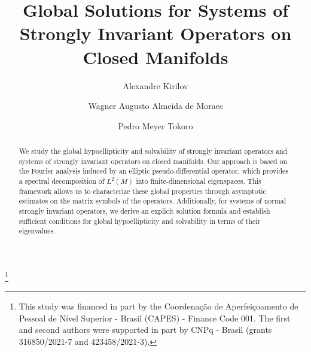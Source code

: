 \documentclass{amsart}
\theoremstyle{definition}
\theoremstyle{remark}
\numberwithin{equation}{section}
\begin{document}
	
	\title[Global Solutions for Systems on closed manifolds]{Global Solutions for Systems of Strongly Invariant Operators on Closed Manifolds}
	
	
	\author[A. Kirilov]{Alexandre Kirilov}
	\address{
		Departamento de Matem\'atica 
		Universidade Federal do Paran\'a  
		Caixa Postal 19096, CEP 81530-090, Curitiba 
		Brasil}
	\thanks{This study was financed in part by the Coordenação de Aperfeiçoamento de Pessoal de Nível Superior - Brasil (CAPES) - Finance Code 001. The first and second authors were supported in part by CNPq - Brasil (grants 316850/2021-7 and 423458/2021-3).}
	
	\author[W. A. A. de Moraes]{Wagner Augusto Almeida de Moraes}
	\address{
		Departamento de Matem\'atica  
		Universidade Federal do Paran\'a  
		Caixa Postal 19096\\  CEP 81530-090, Curitiba, Paran\'a 
		Brasil}
	
	\author[P. M. Tokoro]{Pedro Meyer Tokoro}
	\address{
		Programa de P\'os-Gradua\c c\~ao em Matem\'atica  
		Universidade Federal do Paran\'a  
		Caixa Postal 19096\\  CEP 81530-090, Curitiba, Paran\'a  
		Brasil}
	
	
	
	
	
	\begin{abstract}
		We study the global hypoellipticity and solvability of strongly invariant operators and systems of strongly invariant operators on closed manifolds. Our approach is based on the Fourier analysis induced by an elliptic pseudo-differential operator, which provides a spectral decomposition of $L^2(M)$ into finite-dimensional eigenspaces. This framework allows us to characterize these global properties through asymptotic estimates on the matrix symbols of the operators. Additionally, for systems of normal strongly invariant operators, we derive an explicit solution formula and establish sufficient conditions for global hypoellipticity and solvability in terms of their eigenvalues. 
	\end{abstract}
\end{document}
